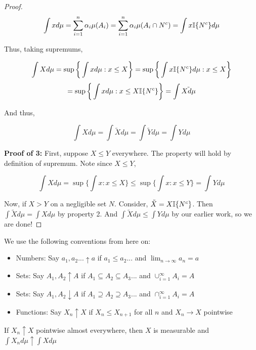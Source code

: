 \begin{proof}
            \[ \int x d\mu = \sum_{i=1}^n \alpha_i \mu(A_i) =  \sum_{i=1}^n \alpha_i \mu(A_i \cap N^c) = \int x\mathbb I\{N^c\} d\mu  \]

            Thus, taking supremums, 

            \[ \int Xd\mu = \sup\bigg\{\int xd\mu : x \leq X \bigg\} = \sup\bigg\{\int x \mathbb I\{N^c\}d\mu : x \leq X \bigg\} \] 
            \[ = \sup\bigg\{\int x d\mu : x \leq X\mathbb I\{N^c\} \bigg\} = \int \tilde{Xd\mu} \]

            And thus, 

            \[ \int X d\mu = \int \tilde{X}d\mu = \int \tilde{Y}d\mu = \int Y d\mu \]

            \textbf{Proof of 3:} First, suppose $X \leq Y$ everywhere. The property will hold by definition of supremum. Note since $X \leq Y$, 

            \[ \int X d\mu = \sup\bigg\{ \int x : x \leq X\bigg\} \leq \sup\bigg\{ \int x : x \leq Y \bigg\} = \int Y d\mu \]

            Now, if $X > Y$ on a negligible set $N$. Consider, $\tilde{X} = X\mathbb I\{N^c\}$. Then 
            $\int \tilde{X}d\mu = \int X d\mu$ by property 2. And $\int \tilde{X}d\mu \leq \int Y d\mu$ by our earlier work, 
            so we are done!
        \end{proof}


    \begin{definition}
        We use the following conventions from here on: 
        \begin{itemize}
            \item Numbers: Say $a_1,a_2... \uparrow a$ if $a_1 \leq a_2...$ and $\lim_{n\to \infty}a_n = a$
            \item Sets: Say $A_1, A_2 \uparrow A$ if $A_1 \subseteq A_2 \subseteq A_3$... and $\cup_{i=1}^\infty A_i  = A$
            \item Sets: Say $A_1, A_2 \downarrow A$ if $A_1 \supseteq A_2 \supseteq A_3$... and $\cap_{i=1}^\infty A_i  = A$
            \item Functions: Say $X_n \uparrow X$ if $X_n \leq X_{n+1}$ for all $n$ and $X_n \to X$ pointwise
        \end{itemize}
    \end{definition}

    \begin{theorem}
        If $X_n \uparrow X$ pointwise almost everywhere, then $X$ is measurable and $\int X_n d\mu \uparrow \int X d\mu$
    \end{theorem}


